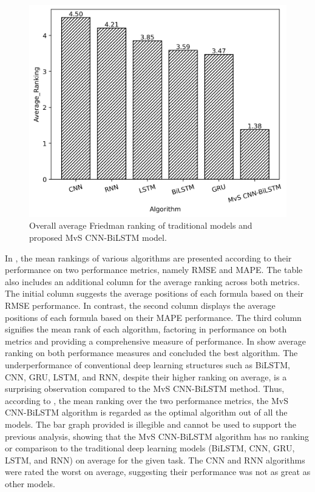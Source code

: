 \documentclass[a4paper, fleqn]{cas-sc}
\theoremstyle{definition}
\theoremstyle{remark}
\begin{document}
  \begin{figure}[h!]
    \centering
    \includegraphics[scale=0.7]{avg_Rank_plot}
    \caption{Overall average Friedman ranking of traditional models and proposed MvS CNN-BiLSTM model.}
    \label{avg_Rank_plot}
  \end{figure}
  In ,  the mean rankings of various algorithms are presented according to their performance on two performance metrics,  namely RMSE and MAPE. The table also includes an additional column for the average ranking across both metrics. The initial column suggests the average positions of each formula based on their RMSE performance. In contrast, the second column displays the average positions of each formula based on their MAPE performance. The third column signifies the mean rank of each algorithm,  factoring in performance on both metrics and providing a comprehensive measure of performance. In  show average ranking on both performance measures and concluded the best algorithm. The underperformance of conventional deep learning structures such as BiLSTM,  CNN,  GRU,  LSTM,  and RNN,  despite their higher ranking on average,  is a surprising observation compared to the MvS CNN-BiLSTM method. Thus,  according to , the mean ranking over the two performance metrics,  the MvS CNN-BiLSTM algorithm is regarded as the optimal algorithm out of all the models. The bar graph provided is illegible and cannot be used to support the previous analysis,  showing that the MvS CNN-BiLSTM algorithm has no ranking or comparison to the traditional deep learning models (BiLSTM,  CNN,  GRU,  LSTM,  and RNN) on average for the given task. The CNN and RNN algorithms were rated the worst on average,  suggesting their performance was not as great as other models.
\end{document}

